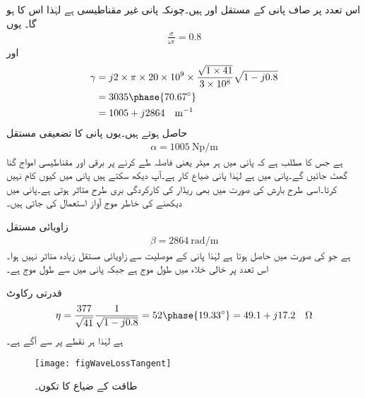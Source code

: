 اس تعدد پر صاف پانی کے مستقل  اور  ہیں۔چونکہ پانی غیر مقناطیسی ہے لہٰذا اس کا  ہو گا۔ یوں
\begin{align*}
\frac{\sigma}{\omega \epsilon}=0.8
\end{align*}
اور
\begin{align*}
\gamma&=j 2\times \pi \times 20\times 10^9 \times \frac{\sqrt{1\times 41}}{3\times 10^8} \sqrt{1-j 0.8}\\
&=3035 \phase{70.67^{\circ}}\\
&=1005+j2864 \quad \si{\meter^{-1}}
\end{align*}
حاصل ہوتے ہیں۔یوں پانی کا تضعیفی مستقل
\begin{align*}
\alpha=\SI{1005}{\neper \per \meter}
\end{align*}
ہے جس کا مطلب ہے کہ پانی میں ہر  میٹر یعنی  فاصلہ طے  کرنے پر برقی اور مقناطیسی امواج  گنا گھٹ جائیں گے۔پانی میں  ہے لہٰذا پانی ضیاع کار ہے۔آپ دیکھ سکتے ہیں  پانی میں کیوں کام نہیں کرتا۔اسی طرح بارش کی صورت میں بھی ریڈار کی کارکردگی بری طرح متاثر ہوتی ہے۔پانی میں دیکھنے کی خاطر موج آواز استعمال کی جاتی ہیں۔

زاویائی مستقل
\begin{align*}
\beta=\SI{2864}{\radian \per \meter}
\end{align*}
ہے جو  کی صورت میں  حاصل ہوتا ہے لہٰذا پانی کے موصلیت سے زاویائی مستقل زیادہ متاثر نہیں ہوا۔ اس تعدد پر خالی خلاء میں طول موج  ہے جبکہ پانی میں  سے طول موج  ہے۔

قدرتی رکاوٹ
\begin{align*}
\eta=\frac{377}{\sqrt{41}}\frac{1}{\sqrt{1-j 0.8}}=52\phase{19.33^\circ}=49.1+j17.2 \quad \si{\ohm}
\end{align*}
ہے لہٰذا  ہر نقطے پر  سے  آگے ہے۔


\begin{figure}
\centering
\texttt{[image: figWaveLossTangent]}
\caption{طاقت کے ضیاع کا تکون۔}
\label{شکل_موج_ضیاع_کا_تکون}
\end{figure}


